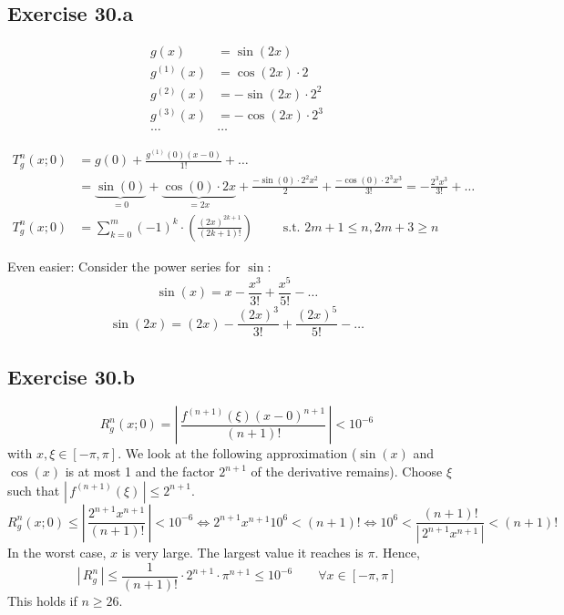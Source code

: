 \documentclass[a4paper]{article}
\theoremstyle{definition}
\newcommand\abs[1]{\left|\,#1\,\right|}
\begin{document}
\subsection{Exercise 30.a}

\begin{align*}
  g(x) &= \sin(2x) \\
  g^{(1)}(x) &= \cos(2x) \cdot 2 \\
  g^{(2)}(x) &= -\sin(2x) \cdot 2^2 \\
  g^{(3)}(x) &= -\cos(2x) \cdot 2^3 \\
  \ldots & \ldots
\end{align*}

\begin{align*}
  T_g^n(x;0) &= g(0) + \frac{g^{(1)}(0) (x - 0)}{1!} + \ldots \\
    &= \underbrace{\sin(0)}_{=0} + \underbrace{\cos(0) \cdot 2x}_{=2x} + \frac{-\sin(0) \cdot 2^2 x^2}{2} + \frac{-\cos(0) \cdot 2^3 x^3}{3!} = -\frac{2^3 x^3}{3!} + \ldots \\
  T_g^n(x;0) &= \sum_{k=0}^m (-1)^k \cdot \left(\frac{(2x)^{2k+1}}{(2k + 1)!}\right)
    \qquad \text{ s.t. } 2m + 1 \leq n, 2m + 3 \geq n
\end{align*}

Even easier: Consider the power series for $\sin$:
\[ \sin(x) = x - \frac{x^3}{3!} + \frac{x^5}{5!} - \ldots \]
\[ \sin(2x) = (2x) - \frac{(2x)^3}{3!} + \frac{(2x)^5}{5!} - \ldots \]

\subsection{Exercise 30.b}
%
\[ R_g^n(x; 0) = \abs{\frac{f^{(n+1)}(\xi)(x - 0)^{n+1}}{(n+1)!}} < 10^{-6} \]
with $x, \xi \in [-\pi, \pi]$. We look at the following approximation ($\sin(x)$ and $\cos(x)$ is at most 1 and the factor $2^{n+1}$ of the derivative remains).
Choose $\xi$ such that $\abs{f^{(n+1)}(\xi)} \leq 2^{n+1}$.
\[
  R_g^n(x;0) \leq \abs{\frac{2^{n+1} x^{n+1}}{(n+1)!}} < 10^{-6}
  \iff
  2^{n+1} x^{n+1} 10^{6} < (n+1)!
  \iff
  10^{6} < \frac{(n+1)!}{\abs{2^{n+1} x^{n+1}}} < (n+1)!
\]
In the worst case, $x$ is very large. The largest value it reaches is $\pi$. Hence,
\[
  \abs{R_g^n} \leq \frac{1}{(n+1)!} \cdot 2^{n+1} \cdot \pi^{n+1} \leq 10^{-6}
  \qquad \forall x \in [-\pi, \pi]
\]
This holds if $n \geq 26$.
\end{document}
